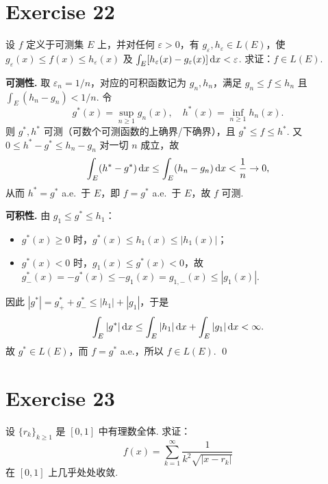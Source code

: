 \documentclass{article}
\begin{document}
\section{Exercise 22}

设 $f$ 定义于可测集 $E$ 上，并对任何 $\varepsilon > 0$，有 $g_\varepsilon, h_\varepsilon \in L(E)$，使
$g_\varepsilon(x) \le f(x) \le h_\varepsilon(x)$ 及 $\int_E [h_\varepsilon(x) - g_\varepsilon(x)]\,\mathrm{d} x < \varepsilon$.
求证：$f \in L(E)$.

\begin{solution}
  \textbf{可测性.}\quad
  取 $\varepsilon_n = 1/n$，对应的可积函数记为 $g_n, h_n$，满足 $g_n \le f \le h_n$
  且 $\int_E(h_n - g_n) < 1/n$. 令
  \[
    g^*(x) = \sup_{n \ge 1} g_n(x), \quad h^*(x) = \inf_{n \ge 1} h_n(x).
  \]
  则 $g^*, h^*$ 可测（可数个可测函数的上确界/下确界），且 $g^* \le f \le h^*$.
  又 $0 \le h^* - g^* \le h_n - g_n$ 对一切 $n$ 成立，故
  \[
    \int_E (h^* - g^*)\,\mathrm{d} x \le \int_E (h_n - g_n)\,\mathrm{d} x < \frac{1}{n} \to 0,
  \]
  从而 $h^* = g^*$ a.e.\ 于 $E$，即 $f = g^*$ a.e.\ 于 $E$，故 $f$ 可测.

  \textbf{可积性.}\quad
  由 $g_1 \le g^* \le h_1$：
  \begin{itemize}
    \item $g^*(x) \ge 0$ 时，$g^*(x) \le h_1(x) \le |h_1(x)|$；
    \item $g^*(x) < 0$ 时，$g_1(x) \le g^*(x) < 0$，故
          $g^*_-(x) = -g^*(x) \le -g_1(x) = g_{1,-}(x) \le |g_1(x)|$.
  \end{itemize}
  因此 $|g^*| = g^*_+ + g^*_- \le |h_1| + |g_1|$，于是
  \[
    \int_E |g^*|\,\mathrm{d} x \le \int_E |h_1|\,\mathrm{d} x + \int_E |g_1|\,\mathrm{d} x < \infty.
  \]
  故 $g^* \in L(E)$，而 $f = g^*$ a.e.，所以 $f \in L(E)$. \qed
\end{solution}

\section{Exercise 23}

设 $\{r_k\}_{k \ge 1}$ 是 $[0, 1]$ 中有理数全体. 求证：
\[
  f(x) = \sum_{k=1}^{\infty} \frac{1}{k^2 \sqrt{|x - r_k|}}
\]
在 $[0, 1]$ 上几乎处处收敛.
\end{document}
